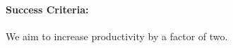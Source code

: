 \documentclass[fleqn,12pt]{article}
\begin{document}
\paragraph*{Success Criteria:}
We aim to increase productivity by a factor of two.


%
%
%
%
\end{document}
